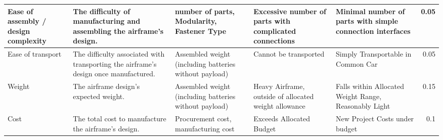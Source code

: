 \begin{table}[h]
{\begin{tabular}{|p{2cm}|p{4cm}|p{4cm}|p{4cm}|p{4cm}|r|}
Ease of assembly / design complexity & The difficulty of manufacturing and assembling the airframe's design.                 & number of parts, Modularity, Fastener Type                                                            & Excessive number of parts with complicated connections   & Minimal number of parts with simple connection interfaces                       & 0.05      \\ \hline
Ease of transport                    & The difficulty associated with transporting the airframe's design once manufactured.  & Assembled weight (including batteries without payload)                                                & Cannot be transported                                                 & Simply Transportable in Common Car                                              & 0.05      \\ \hline
Weight                               & The airframe design's expected weight.                                                & Assembled weight (including batteries without payload)                                                & Heavy Airframe, outside of allocated weight allowance    & Falls within Allocated Weight Range, Reasonably Light                           & 0.15      \\ \hline
Cost                                 & The total cost to manufacture the airframe's design.                                  & Procurement cost, manufacturing cost                                                                  & Exceeds Allocated Budget                                 & New Project Costs under budget                                                  & 0.1       \\ \hline
\end{tabular}%
}
\end{table}




